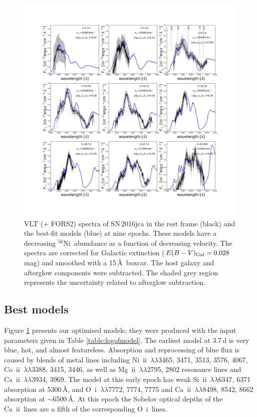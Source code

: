 \documentclass[fleqn,usenatbib]{mnras}
\newcommand{\OI}{O~{\sc i}}
\newcommand{\MgII}{Mg~{\sc ii}}
\newcommand{\SiII}{Si~{\sc ii}}
\newcommand{\CaII}{Ca~{\sc ii}}
\newcommand{\CoII}{Co~{\sc ii}}
\newcommand{\NiII}{Ni~{\sc ii}}
\newcommand{\Nifs}{$^{56}$Ni}
\newcommand{\ab}{$\sim$}
\begin{document}
\begin{figure}
\centering
\includegraphics[scale=0.3]{plots/bestmodel.pdf}
\caption{VLT (+ FORS2) spectra of SN\,2016jca in the rest frame (black) and the best-fit models (blue) at nine epochs. These models have a decreasing \Nifs\ abundance as a function of decreasing velocity.  The spectra are corrected for Galactic extinction ($E(B-V)_{\rm Gal} = 0.028$\,mag) and smoothed with a 15\,\AA\ boxcar.  The host galaxy and afterglow components were subtracted.  The shaded grey region represents the uncertainty related to afterglow subtraction.}
\label{fig:models}
\end{figure}

\subsection{Best models}

Figure \ref{fig:models} presents our optimised models; they were produced with 
the input parameters given in Table \ref{table:logofmodel}.
The earliest model at 3.7\,d is very blue, hot, and almost featureless. 
Absorption and reprocessing of blue flux is caused by blends of metal lines
including \NiII\ $\lambda\lambda$3465, 3471, 3513, 3576, 4067, \CoII\ $\lambda\lambda$3388, 3415, 3446, as well as \MgII\ $\lambda\lambda$2795, 2802 resonance lines and \CaII\ $\lambda\lambda$3934, 3969.
The model at this early epoch  has weak \SiII\ $\lambda\lambda$6347, 6371 absorption at 5300\,\AA, 
and \OI\ $\lambda\lambda$7772, 7774, 7775 and \CaII\ $\lambda\lambda$8498, 8542, 8662 absorption  at \ab6500\,\AA. At this epoch the Sobelov optical depths of the \CaII\ lines are a fifth of the corresponding \OI\ lines. 
\end{document}
